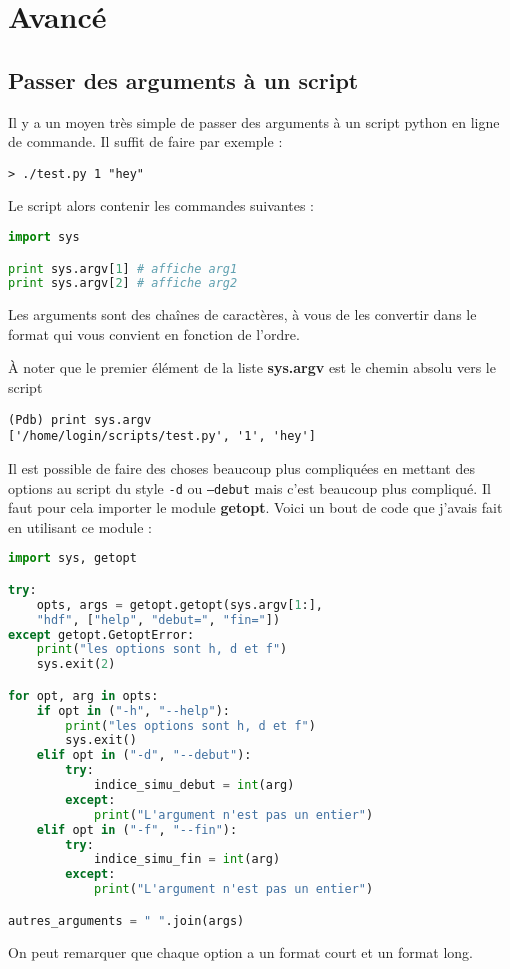 \documentclass[a4paper,twoside]{article}
\begin{document}
\section{Avancé}
\subsection{Passer des arguments à un script}
Il y a un moyen très simple de passer des arguments à un script python en ligne de commande. Il suffit de faire par exemple :
\begin{verbatim}
> ./test.py 1 "hey"
\end{verbatim}

Le script alors contenir les commandes suivantes :
\begin{lstlisting}[language=python]
import sys

print sys.argv[1] # affiche arg1
print sys.argv[2] # affiche arg2
\end{lstlisting}
Les arguments sont des chaînes de caractères, à vous de les convertir dans le format qui vous convient en fonction de l'ordre.

\begin{remarque}
À noter que le premier élément de la liste \textbf{sys.argv} est le chemin absolu vers le script
\begin{verbatim}
(Pdb) print sys.argv
['/home/login/scripts/test.py', '1', 'hey']
\end{verbatim}
\end{remarque}

\bigskip

Il est possible de faire des choses beaucoup plus compliquées en mettant des options au script du style \texttt{-d} ou \texttt{--debut} mais c'est beaucoup plus compliqué. Il faut pour cela importer le module \textbf{getopt}. Voici un bout de code que j'avais fait en utilisant ce module : 
\begin{lstlisting}[language=python]
import sys, getopt

try:                                
    opts, args = getopt.getopt(sys.argv[1:], 
    "hdf", ["help", "debut=", "fin="])
except getopt.GetoptError:          
    print("les options sont h, d et f")                        
    sys.exit(2)

for opt, arg in opts:                
    if opt in ("-h", "--help"):      
        print("les options sont h, d et f")                    
        sys.exit()                  
    elif opt in ("-d", "--debut"):
        try:
            indice_simu_debut = int(arg)
        except:
            print("L'argument n'est pas un entier")
    elif opt in ("-f", "--fin"): 
        try:
            indice_simu_fin = int(arg)
        except:
            print("L'argument n'est pas un entier")

autres_arguments = " ".join(args)
\end{lstlisting}
On peut remarquer que chaque option a un format court et un format long.

\printindex
\end{document}
